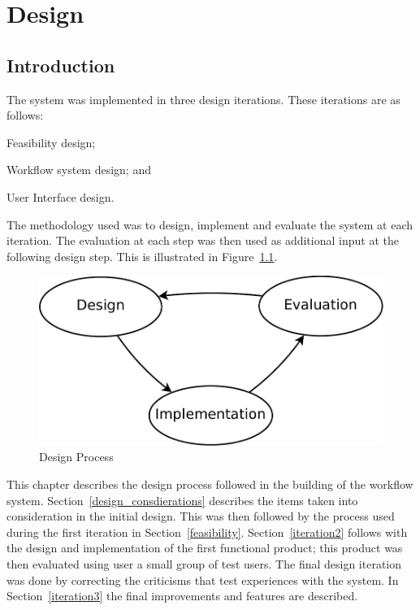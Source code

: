 \chapter{Design\label{chap2}}
\section{Introduction}
The  system was implemented in three design iterations. These iterations are
as follows: \begin{inparaenum}[(i)] \item Feasibility design;
\item Workflow system design; and \item User Interface design.
\end{inparaenum} The methodology used was to design, implement
and evaluate the system at each iteration. The evaluation at
each step was then used as additional input at the following
design step. This is illustrated in Figure~\ref{design_figure}.

\begin{figure}[!h]
\begin{center}
\includegraphics[scale=0.5]{figures/design_cycle.pdf}
\end{center}
\caption{Design Process}
\label{design_figure}
\end{figure}

\noindent This chapter describes the design process followed in the building
of the workflow system. Section~\ref{design_consdierations} describes
the items taken into consideration in the initial design. This was then
followed by the process used during the first iteration in Section~\ref{feasibility}.
Section~\ref{iteration2} follows with the design and implementation of the
first functional product; this product was then evaluated using user a small
group of test users.
The final design iteration was done by correcting the criticisms that test
experiences with the system. In Section~\ref{iteration3} the final
improvements and features are described.

